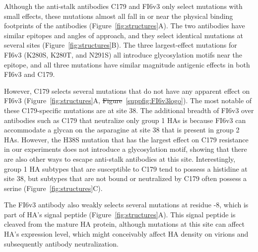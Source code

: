 \documentclass[11pt]{article}
\providecommand{\DIFaddtex}[1]{{\protect\color{blue}\uwave{#1}}} %
\providecommand{\DIFdeltex}[1]{{\protect\color{red}\sout{#1}}}                      %
\providecommand{\DIFaddbegin}{} %
\providecommand{\DIFaddend}{} %
\providecommand{\DIFdelbegin}{} %
\providecommand{\DIFdelend}{} %
\providecommand{\DIFadd}[1]{\texorpdfstring{\DIFaddtex{#1}}{#1}} %
\providecommand{\DIFdel}[1]{\texorpdfstring{\DIFdeltex{#1}}{}} %
\begin{document}
Although the anti-stalk antibodies C179 and FI6v3 only select mutations with small effects, these mutations almost all fall in or near the physical binding footprints of the antibodies (Figure~\ref{fig:structures}A).
The two antibodies have similar epitopes and angles of approach\cite{dreyfus2013structure}, and they select identical mutations at several sites (Figure~\ref{fig:structures}B). 
The three largest-effect mutations for FI6v3 (K280S, K280T, and N291S) all introduce glycosylation motifs near the epitope, and all three mutations have similar magnitude antigenic effects in both FI6v3 and C179.

However, C179 selects several mutations that do not have any apparent effect on FI6v3 (Figure~\ref{fig:structures}A, \DIFdelbegin \DIFdel{Figure}\DIFdelend \DIFaddbegin \DIFadd{Supplementary Fig.}\DIFaddend ~\ref{suppfig:FI6v3logo}).
The most notable of these C179-specific mutations are at site 38.
The additional breadth of FI6v3 over antibodies such as C179 that neutralize only group 1 HAs is because FI6v3 can accommodate a glycan on the asparagine at site 38 that is present in group 2 HAs\cite{corti2011neutralizing,sui2009structural,ekiert2009antibody}. 
However, the H38S mutation that has the largest effect on C179 resistance in our experiments does not introduce a glycosylation motif, showing that there are also other ways to escape anti-stalk antibodies at this site.
Interestingly, group 1 HA subtypes that are susceptible to C179 tend to possess a histidine at site 38, but subtypes that are not bound or neutralized by C179 often possess a serine (Figure~\ref{fig:structures}C). 

The FI6v3 antibody also weakly selects several mutations at residue -8, which is part of HA's signal peptide (Figure~\ref{fig:structures}A). 
This signal peptide is cleaved from the mature HA protein\cite{daniels2003n,burke2014recommended}, although mutations at this site can affect HA's expression level\cite{nordholm2017translational}, which might conceivably affect HA density on virions and subsequently antibody neutralization\cite{corti2011neutralizing,joyce2016vaccine}.
\end{document}
